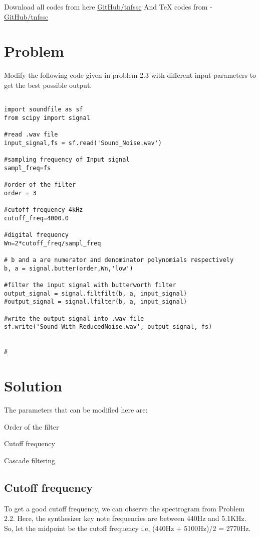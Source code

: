 \documentclass[journal,12pt]{IEEEtran}
\begin{document}
Download all codes from here \newline
\href{https://github.com/tnfssc/IITH_EE3025_H12021/tree/master/assignment-1}{GitHub/tnfssc} \newline
And TeX codes from - \newline
\href{https://github.com/tnfssc/IITH_EE3025_H12021/tree/master/assignment-1}{GitHub/tnfssc}

\section{\textbf{Problem}}

Modify the following code given in problem 2.3 with different input parameters to get the best possible output.
\begin{lstlisting}

import soundfile as sf
from scipy import signal

#read .wav file
input_signal,fs = sf.read('Sound_Noise.wav')

#sampling frequency of Input signal
sampl_freq=fs

#order of the filter
order = 3

#cutoff frequency 4kHz
cutoff_freq=4000.0

#digital frequency
Wn=2*cutoff_freq/sampl_freq

# b and a are numerator and denominator polynomials respectively
b, a = signal.butter(order,Wn,'low')

#filter the input signal with butterworth filter
output_signal = signal.filtfilt(b, a, input_signal)
#output_signal = signal.lfilter(b, a, input_signal)

#write the output signal into .wav file
sf.write('Sound_With_ReducedNoise.wav', output_signal, fs)


#
\end{lstlisting}

\section{\textbf{Solution}}
The parameters that can be modified here are:
\begin{description}[font=$\bullet$\scshape\bfseries]
  \item[]{Order of the filter}
  \item[]{Cutoff frequency}
  \item[]{Cascade filtering}
\end{description}

\subsection{\textbf{Cutoff frequency}}
To get a good cutoff frequency, we can observe the spectrogram from Problem 2.2. Here, the synthesizer key note frequencies are between 440Hz and 5.1KHz. So, let the midpoint be the cutoff frequency i.e, (440Hz + 5100Hz)/2 = 2770Hz.
\end{document}
